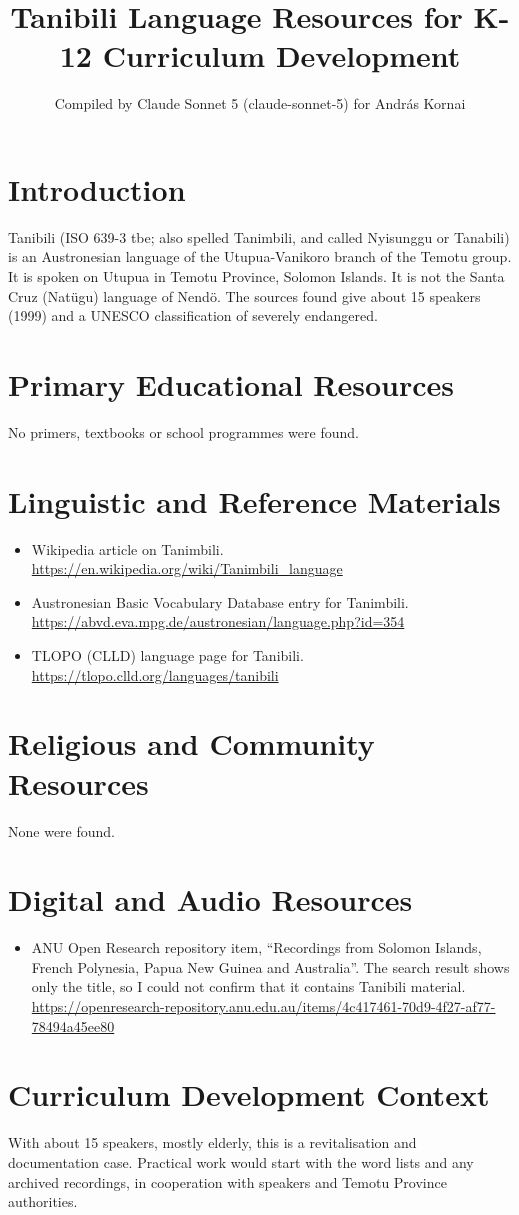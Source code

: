 \documentclass[12pt]{article}
\title{Tanibili Language Resources for K-12 Curriculum Development}
\author{Compiled by Claude Sonnet 5 (claude-sonnet-5) for Andr\'as Kornai}
\date{}
\begin{document}
\maketitle

\section{Introduction}
Tanibili (ISO 639-3 tbe; also spelled Tanimbili, and called Nyisunggu or Tanabili) is an Austronesian language of the Utupua-Vanikoro branch of the Temotu group. It is spoken on Utupua in Temotu Province, Solomon Islands. It is not the Santa Cruz (Nat\"ugu) language of Nend\"o. The sources found give about 15 speakers (1999) and a UNESCO classification of severely endangered.

\section{Primary Educational Resources}
No primers, textbooks or school programmes were found.

\section{Linguistic and Reference Materials}
\begin{itemize}
\item Wikipedia article on Tanimbili. \url{https://en.wikipedia.org/wiki/Tanimbili_language}
\item Austronesian Basic Vocabulary Database entry for Tanimbili. \url{https://abvd.eva.mpg.de/austronesian/language.php?id=354}
\item TLOPO (CLLD) language page for Tanibili. \url{https://tlopo.clld.org/languages/tanibili}
\end{itemize}

\section{Religious and Community Resources}
None were found.

\section{Digital and Audio Resources}
\begin{itemize}
\item ANU Open Research repository item, ``Recordings from Solomon Islands, French Polynesia, Papua New Guinea and Australia''. The search result shows only the title, so I could not confirm that it contains Tanibili material. \url{https://openresearch-repository.anu.edu.au/items/4c417461-70d9-4f27-af77-78494a45ee80}
\end{itemize}

\section{Curriculum Development Context}
With about 15 speakers, mostly elderly, this is a revitalisation and documentation case. Practical work would start with the word lists and any archived recordings, in cooperation with speakers and Temotu Province authorities.
\end{document}
